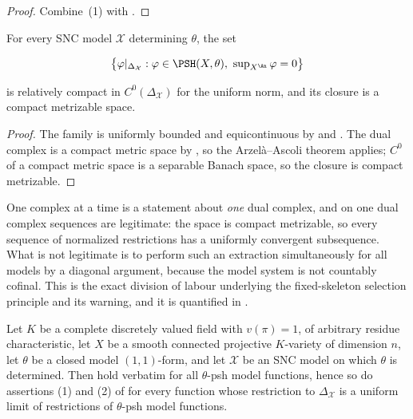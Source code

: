 \begin{proof}
Combine \,(1) with
.
\end{proof}

\begin{corollary}
\label{cor:ch22-arzela-ascoli}
For every SNC model \(\mathcal X\) determining \(\theta\), the set

\[
 \bigl\{\varphi|_{\Delta_{\mathcal X}}:
        \varphi\in\PSH(X,\theta),\ \sup\nolimits_{X^{\An}}\varphi=0\bigr\}
\]

is relatively compact in \(C^0(\Delta_{\mathcal X})\) for the uniform norm,
and its closure is a compact metrizable space.
\end{corollary}

\begin{proof}
The family is uniformly bounded and equicontinuous by
 and
.  The dual complex is a compact metric
space by , so the Arzel\`a--Ascoli theorem
applies; \(C^0\) of a compact metric space is a separable Banach space, so
the closure is compact metrizable.
\end{proof}

\begin{warning}{One complex at a time}
 is a statement about \emph{one} dual complex,
and on one dual complex sequences are legitimate: the space is compact
metrizable, so every sequence of normalized restrictions has a uniformly
convergent subsequence.  What is not legitimate is to perform such an
extraction simultaneously for all models by a diagonal argument, because the
model system is not countably cofinal.  This is the exact division of labour
underlying the fixed-skeleton selection principle
 and its warning, and it is
quantified in .
\end{warning}

\begin{proposition}
\label{prop:ch22-characteristic-free-estimates}
Let \(K\) be a complete discretely valued field with \(v(\pi)=1\), of
arbitrary residue characteristic, let \(X\) be a smooth connected projective
\(K\)-variety of dimension \(n\), let \(\theta\) be a closed model
\((1,1)\)-form, and let \(\mathcal X\) be an SNC model on which
\(\theta\) is determined.  Then
 hold verbatim for
all \(\theta\)-psh model functions, hence so do assertions (1) and (2) of
 for every function whose restriction
to \(\Delta_{\mathcal X}\) is a uniform limit of restrictions of
\(\theta\)-psh model functions.
\end{proposition}

